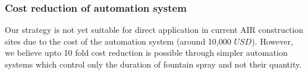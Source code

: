 \documentclass[tc, manuscript]{copernicus}
\begin{document}
\subsubsection{Cost reduction of automation system}

Our strategy is not yet suitable for direct application in current AIR construction sites due to the cost of the
automation system (around 10,000 $USD$). However, we believe upto 10 fold cost reduction is possible through
simpler automation systems which control only the duration of fountain spray and not their quantity. 


%

%

%
%
\end{document}
